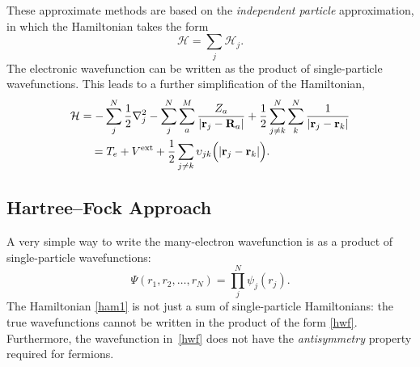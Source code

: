 These approximate methods are based on the \textit{independent particle} approximation, in which the Hamiltonian takes the form
\begin{equation}
	\mathcal{H} = \sum_j \mathcal{H}_j.
\end{equation}
The electronic wavefunction can be written as the product of single-particle wavefunctions. This leads to a further simplification of the Hamiltonian,
\begin{align}\label{ham1}
	\mathcal{H} &  = -\sum_j^N \frac{1}{2}\nabla^2_j - \sum_j^N\sum_a^M \frac{Z_a}{\abs{\vb{r}_j - \vb{R}_a}} + \frac{1}{2}\sum^N_{j\neq k}\sum^N_k\frac{1}{\abs{\vb{r}_j - \vb{r}_k}} \nonumber \\ 
	 &\quad  = T_e + V^{\text{ext}} + \frac{1}{2}\sum_{j\neq k} \upsilon_{jk}\Big(\abs{\vb{r}_j - \vb{r}_k}\Big) .
\end{align}



\subsection{Hartree--Fock Approach}
A very simple way to write the many-electron wavefunction is as a product of single-particle wavefunctions:
\begin{equation}\label{hwf}
\Psi(r_1,r_2,\dots,r_N) = \prod_j^N \psi_j(r_j).
\end{equation}
The Hamiltonian \eqref{ham1} is not just a sum of single-particle Hamiltonians: the true wavefunctions cannot be written in the product of the form \eqref{hwf}. Furthermore, the wavefunction in~\eqref{hwf} does not have the \textit{antisymmetry} property required for fermions.

